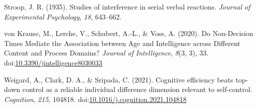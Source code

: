 \documentclass[
  ,man]{apa6}
\newlength{\cslhangindent}
\newlength{\cslentryspacingunit} %
\newenvironment{CSLReferences}[2] %
 {%
  \setlength{\parindent}{0pt}
  \ifodd #1
  \let\oldpar\par
  \def\par{\hangindent=\cslhangindent\oldpar}
  \fi
  \setlength{\parskip}{#2\cslentryspacingunit}
 }%
 {}
\begin{document}
\begin{CSLReferences}{1}{0}
\leavevmode{}%
Stroop, J. R. (1935). Studies of interference in serial verbal reactions. \emph{Journal of Experimental Psychology}, \emph{18}, 643--662.

\leavevmode{}%
von Krause, M., Lerche, V., Schubert, A.-L., \& Voss, A. (2020). Do {Non-Decision Times Mediate} the {Association} between {Age} and {Intelligence} across {Different Content} and {Process Domains}? \emph{Journal of Intelligence}, \emph{8}(3, 3), 33. doi:\href{https://doi.org/10.3390/jintelligence8030033}{10.3390/jintelligence8030033}

\leavevmode{}%
Weigard, A., Clark, D. A., \& Sripada, C. (2021). Cognitive efficiency beats top-down control as a reliable individual difference dimension relevant to self-control. \emph{Cognition}, \emph{215}, 104818. doi:\href{https://doi.org/10.1016/j.cognition.2021.104818}{10.1016/j.cognition.2021.104818}

\end{CSLReferences}


\clearpage
\theendnotes
\end{document}

